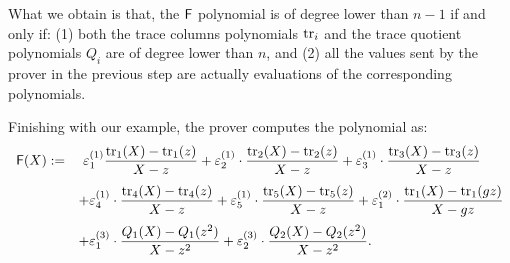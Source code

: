 What we obtain is that, the $\textsf{F}$ polynomial is of degree lower than $n-1$ if and only if: (1) both the trace columns polynomials $\text{tr}_i$ and the trace quotient polynomials $Q_i$ are of degree lower than $n$, and (2) all the values sent by the prover in the previous step are actually evaluations of the corresponding polynomials.

Finishing with our example, the prover computes the \FRI polynomial as:
\begin{align*}
\begin{array}{rl}
  \textsf{F}(X) := &\displaystyle~\varepsilon_1^{(1)} \frac{\text{tr}_1(X) - \text{tr}_1(z)}{X-z} + \varepsilon_2^{(1)} \cdot \frac{\text{tr}_2(X) - \text{tr}_2(z)}{X-z} + \varepsilon_3^{(1)} \cdot \frac{\text{tr}_3(X) - \text{tr}_3(z)}{X-z} \\[0.4cm]
  &\displaystyle + \varepsilon_4^{(1)} \cdot \frac{\text{tr}_4(X) - \text{tr}_4(z)}{X-z} + \varepsilon_5^{(1)} \cdot \frac{\text{tr}_5(X) - \text{tr}_5(z)}{X-z} + \varepsilon_1^{(2)} \cdot \frac{\text{tr}_1(X) - \text{tr}_1(gz)}{X-gz}\\[0.4cm]
  &\displaystyle + \varepsilon_1^{(3)} \cdot \frac{Q_1(X) - Q_1(z^2)}{X-z^2} + \varepsilon_2^{(3)} \cdot \frac{Q_2(X) - Q_2(z^2)}{X-z^2}.
\end{array}
\end{align*}






